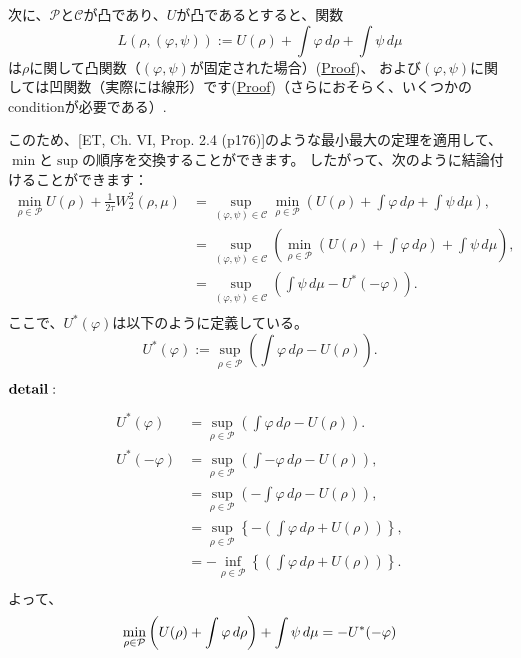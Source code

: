 \documentclass{jsarticle}
\theoremstyle{definition}
\begin{document}
次に、\(\mathcal{P}\)と\(\mathcal{C}\)が凸であり、\(U\)が凸であるとすると、関数
\[
  \label{eq:L}
  L(\rho, (\varphi, \psi)) := U(\rho) + \int \varphi \, d\rho + \int \psi \, d\mu
\]
は\hypertarget{rho_convex}{\(\rho\)に関して凸関数}（\((\varphi, \psi)\)が固定された場合）(\hyperlink{Proof:rho_convex}{Proof})、
および\hypertarget{varphipsi_concave}{\((\varphi, \psi)\)に関しては凹関数}（実際には線形）です(\hyperlink{Proof:varphipsi_concave}{Proof})（さらにおそらく、いくつかのconditionが必要である）.

このため、[ET, Ch. VI, Prop. 2.4 (p176)]のような最小最大の定理を適用して、\(\min\)と\(\sup\)の順序を交換することができます。
したがって、次のように結論付けることができます：
\begin{align*}
  \min_{\rho \in \mathcal{P}} U(\rho) + \frac{1}{2\tau} W_2^2(\rho, \mu) &= \sup_{(\varphi, \psi) \in \mathcal{C}} \min_{\rho \in \mathcal{P}} \left(U(\rho) + \int \varphi \, d\rho + \int \psi \, d\mu \right),\\
                                                                          &= \sup_{(\varphi, \psi) \in \mathcal{C}} \left(\min_{\rho \in \mathcal{P}} \left(U(\rho) + \int \varphi \, d\rho\right) + \int \psi \, d\mu\right),\\
                                                                          &= \sup_{(\varphi, \psi) \in \mathcal{C}} \left(\int \psi \, d\mu - U^*(- \varphi)\right).\\
\end{align*}
ここで、$U^*(\varphi)$は以下のように定義している。 
\[
  U^*(\varphi) := \sup_{\rho \in \mathcal{P}} \left(\int \varphi \, d\rho - U(\rho) \right).
\]

{\color{gray}
$\bold{detail:}$

\begin{align*}
  U^*(\varphi)   &= \sup_{\rho \in \mathcal{P}} \left(\int \varphi \, d\rho - U(\rho) \right).\\
  U^*(- \varphi) &= \sup_{\rho \in \mathcal{P}} \left(\int - \varphi \, d\rho - U(\rho) \right),\\
                 &= \sup_{\rho \in \mathcal{P}} \left(- \int \varphi \, d\rho - U(\rho) \right),\\
                 &= \sup_{\rho \in \mathcal{P}} \left\{ -  \left(\int \varphi \, d\rho + U(\rho) \right) \right\} ,\\
                 &= - \inf_{\rho \in \mathcal{P}} \left\{ \left(\int \varphi \, d\rho + U(\rho) \right) \right\} .\\
\end{align*}
よって、
\[
  \min_{\rho \in \mathcal{P}} \left(U(\rho) + \int \varphi \, d\rho\right) + \int \psi \, d\mu = - U^*(- \varphi)\\
\]
}
\end{document}
